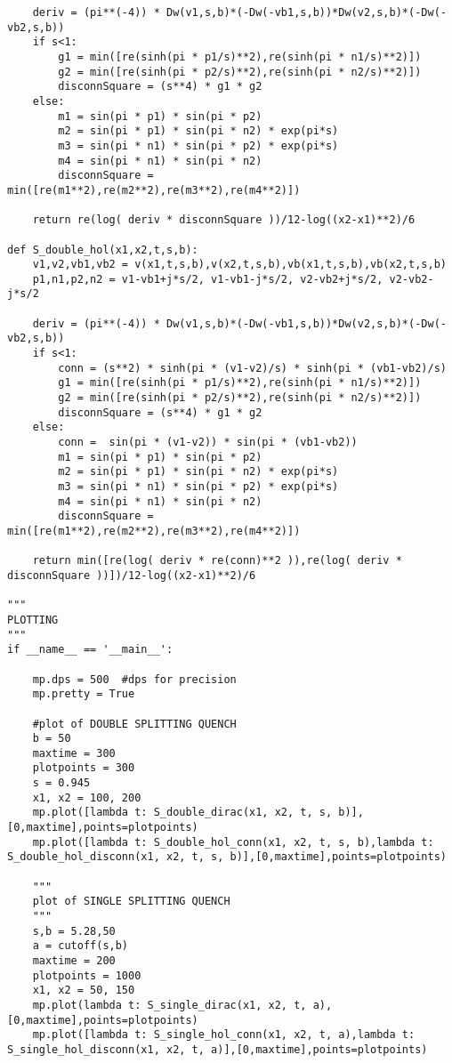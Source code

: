 \begin{lstlisting}
	deriv = (pi**(-4)) * Dw(v1,s,b)*(-Dw(-vb1,s,b))*Dw(v2,s,b)*(-Dw(-vb2,s,b))
	if s<1:
		g1 = min([re(sinh(pi * p1/s)**2),re(sinh(pi * n1/s)**2)])
		g2 = min([re(sinh(pi * p2/s)**2),re(sinh(pi * n2/s)**2)])
		disconnSquare = (s**4) * g1 * g2
	else:
		m1 = sin(pi * p1) * sin(pi * p2)
		m2 = sin(pi * p1) * sin(pi * n2) * exp(pi*s)
		m3 = sin(pi * n1) * sin(pi * p2) * exp(pi*s)
		m4 = sin(pi * n1) * sin(pi * n2)
		disconnSquare =  min([re(m1**2),re(m2**2),re(m3**2),re(m4**2)])

	return re(log( deriv * disconnSquare ))/12-log((x2-x1)**2)/6

def S_double_hol(x1,x2,t,s,b):
	v1,v2,vb1,vb2 = v(x1,t,s,b),v(x2,t,s,b),vb(x1,t,s,b),vb(x2,t,s,b)
	p1,n1,p2,n2 = v1-vb1+j*s/2, v1-vb1-j*s/2, v2-vb2+j*s/2, v2-vb2-j*s/2

	deriv = (pi**(-4)) * Dw(v1,s,b)*(-Dw(-vb1,s,b))*Dw(v2,s,b)*(-Dw(-vb2,s,b))
	if s<1:
		conn = (s**2) * sinh(pi * (v1-v2)/s) * sinh(pi * (vb1-vb2)/s)
		g1 = min([re(sinh(pi * p1/s)**2),re(sinh(pi * n1/s)**2)])
		g2 = min([re(sinh(pi * p2/s)**2),re(sinh(pi * n2/s)**2)])
		disconnSquare = (s**4) * g1 * g2
	else:
		conn =  sin(pi * (v1-v2)) * sin(pi * (vb1-vb2))
		m1 = sin(pi * p1) * sin(pi * p2)
		m2 = sin(pi * p1) * sin(pi * n2) * exp(pi*s)
		m3 = sin(pi * n1) * sin(pi * p2) * exp(pi*s)
		m4 = sin(pi * n1) * sin(pi * n2)
		disconnSquare =  min([re(m1**2),re(m2**2),re(m3**2),re(m4**2)])

	return min([re(log( deriv * re(conn)**2 )),re(log( deriv * disconnSquare ))])/12-log((x2-x1)**2)/6
	
"""
PLOTTING
"""
if __name__ == '__main__':

	mp.dps = 500  #dps for precision
	mp.pretty = True

	#plot of DOUBLE SPLITTING QUENCH
	b = 50
	maxtime = 300
	plotpoints = 300
	s = 0.945
	x1, x2 = 100, 200
	mp.plot([lambda t: S_double_dirac(x1, x2, t, s, b)],[0,maxtime],points=plotpoints)
	mp.plot([lambda t: S_double_hol_conn(x1, x2, t, s, b),lambda t: S_double_hol_disconn(x1, x2, t, s, b)],[0,maxtime],points=plotpoints)
	
	"""
	plot of SINGLE SPLITTING QUENCH
	"""
	s,b = 5.28,50
	a = cutoff(s,b)
	maxtime = 200
	plotpoints = 1000
	x1, x2 = 50, 150
	mp.plot(lambda t: S_single_dirac(x1, x2, t, a),[0,maxtime],points=plotpoints)
	mp.plot([lambda t: S_single_hol_conn(x1, x2, t, a),lambda t: S_single_hol_disconn(x1, x2, t, a)],[0,maxtime],points=plotpoints)
\end{lstlisting}